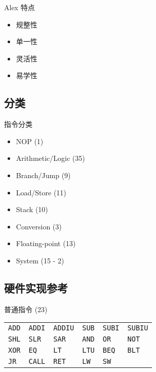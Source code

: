 \documentclass{beamer}
\renewcommand{\t}{\texttt}
\begin{document}
\begin{frame}{Alex 特点}
    \begin{itemize}
        \item 规整性
        \item 单一性
        \item 灵活性
        \item 易学性
    \end{itemize}
\end{frame}

\subsection{分类}

\begin{frame}{指令分类}
    \begin{itemize}
        \item NOP (1)
        \item Arithmetic/Logic (35)
        \item Branch/Jump (9)
        \item Load/Store (11)
        \item Stack (10)
        \item Conversion (3)
        \item Floating-point (13)
        \item System (15 - 2)
    \end{itemize}
\end{frame}

\subsection{硬件实现参考}

\begin{frame}{普通指令 (23)}
    \begin{center}
    \begin{tabular}{llllll}
        \t{ADD} & \t{ADDI} & \t{ADDIU} & \t{SUB} & \t{SUBI} & \t{SUBIU} \\
        \t{SHL} & \t{SLR} & \t{SAR} & \t{AND} & \t{OR} & \t{NOT} \\
        \t{XOR} & \t{EQ} & \t{LT} & \t{LTU} & \t{BEQ} & \t{BLT} \\
        \t{JR}  & \t{CALL} & \t{RET} & \t{LW} & \t{SW} & \\
    \end{tabular}
    \end{center}
\end{frame}
\end{document}
